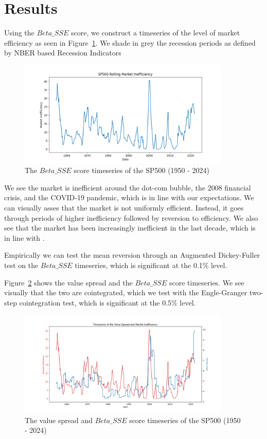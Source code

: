 \section{Results}

Using the $Beta\_SSE$ score, we construct a timeseries of the level of market efficiency as seen in Figure~\ref{fig:sp_500_SSE_beta_ts}.
We shade in grey the recession periods as defined by NBER based Recession Indicators \citep{usrec}
\begin{figure}[h!]
    \centering
    \includegraphics[width=0.9\textwidth]{../figs/SP500 Rolling Market Inefficiency.png}
    \caption{The $Beta\_SSE$ score timeseries of the SP500 (1950 - 2024)}
    \label{fig:sp_500_SSE_beta_ts}
\end{figure}

We see the market is inefficient around the dot-com bubble, the 2008 financial crisis, and the COVID-19 pandemic, which is in line with our expectations.
We can visually asses that the market is not uniformly efficient. Instead, it goes through periods of higher inefficiency followed by reversion to efficiency.
We also see that the market has been increasingly inefficient in the last decade, which is in line with \citet{asness_2024}.

Empirically we can test the mean reversion through an Augmented Dickey-Fuller test \citep{cheung1995lag} on the $Beta\_SSE$ timeseries, which is significant at the 0.1\% level.

Figure~\ref{value_spread_beta_sse} shows the value spread and the $Beta\_SSE$ score timeseries. We see visually that the two are cointegrated, which we test with
the Engle-Granger two-step cointegration test, which is significant at the 0.5\% level.

\begin{figure}[h!]
    \centering
    \includegraphics[width=0.9\textwidth]{../figs/Value Spread and Market Inefficiency.png}
    \caption{The value spread and $Beta\_SSE$ score timeseries of the SP500 (1950 - 2024)}
    \label{value_spread_beta_sse}
\end{figure}